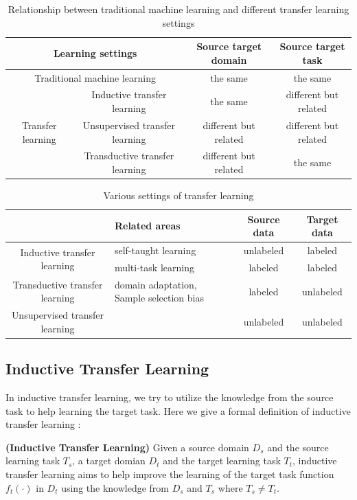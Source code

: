 \begin{table}[htbp]
	\centering
	\caption{Relationship between traditional machine learning and different transfer learning settings}
	\begin{tabular}{|c|c|c|c|}
		\hline
		\multicolumn{2}{|c|}{Learning settings} & Source target domain & Source target task \\
		\hline
		\multicolumn{2}{|c|}{Traditional machine learning} & the same & the same \\\hline
		\multirow{3}{*}{Transfer learning} & Inductive transfer learning & the same & different but related \\\cline{2-4}
		& Unsupervised transfer learning & different but related & different but related \\\cline{2-4}
		& Transductive transfer learning & different but related & the same \\\hline	
	\end{tabular}%
	\label{tab:related:transfercmp}%
\end{table}%

\begin{table}[htbp]
	\centering
	\caption{Various settings of transfer learning}
	\begin{tabular}{|c|C{4cm}|c|c|}
		\hline
		& Related areas & Source data & Target data \\
		\hline
		[4]{*}{Inductive transfer learning} & self-taught learning & unlabeled & labeled \\
		& multi-task learning & labeled & labeled \\\hline
		 Transductive transfer learning& domain adaptation, Sample selection bias & labeled & unlabeled \\\hline
		Unsupervised transfer learning &       & unlabeled & unlabeled \\
		\hline
	\end{tabular}%
	\label{tab:related:transfersetting}%
\end{table}%

\subsection{Inductive Transfer Learning}
In inductive transfer learning, we try to utilize the knowledge from the source task to help learning the target task. Here we give a formal definition of inductive transfer learning \cite{pan2010survey}:
\begin{definition}{\textbf{(Inductive Transfer Learning)}}
	Given a source domain $D_s$ and the source learning task $T_s$, a target domian $D_t$ and the target learning task $T_t$, inductive transfer learning aims to help improve the learning of the target task function $f_t(\cdot)$ in $D_t$ using the knowledge from $D_s$ and $T_s$ where $T_s \neq T_t$.
\end{definition}

